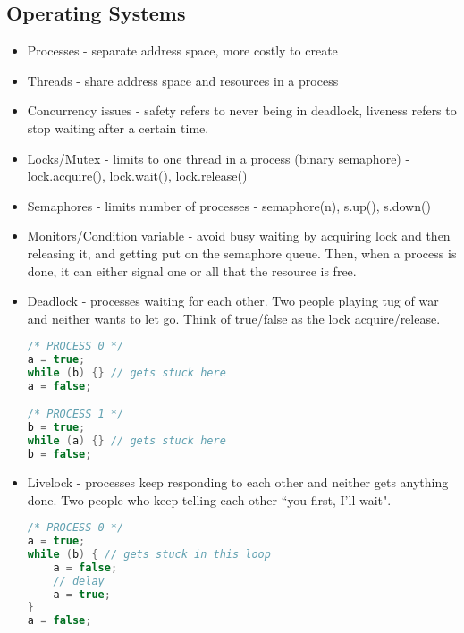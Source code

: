 \documentclass[10pt]{article}
\begin{document}
\subsection{Operating Systems}
\begin{itemize}
    \item Processes - separate address space, more costly to create
    \item Threads - share address space and resources in a process
    \item Concurrency issues - safety refers to never being in deadlock, liveness refers to stop waiting after a certain time.
    \item Locks/Mutex - limits to one thread in a process (binary semaphore) - lock.acquire(), lock.wait(), lock.release()
    \item Semaphores - limits number of processes - semaphore(n), s.up(), s.down()
    \item Monitors/Condition variable - avoid busy waiting by acquiring lock and then releasing it, and getting put on the semaphore queue. Then, when a process is done, it can either signal one or all that the resource is free.
    \item Deadlock - processes waiting for each other. Two people playing tug of war and neither wants to let go. Think of true/false as the lock acquire/release.
    \begin{lstlisting}[language=c]
/* PROCESS 0 */
a = true; 
while (b) {} // gets stuck here
a = false; 

/* PROCESS 1 */
b = true;
while (a) {} // gets stuck here
b = false;
    \end{lstlisting}
    \item Livelock - processes keep responding to each other and neither gets anything done. Two people who keep telling each other ``you first, I'll wait".
\begin{lstlisting}[language=c]
/* PROCESS 0 */
a = true; 
while (b) { // gets stuck in this loop
    a = false;
    // delay
    a = true;
}
a = false; 


\end{lstlisting}
\end{itemize}
\end{document}
